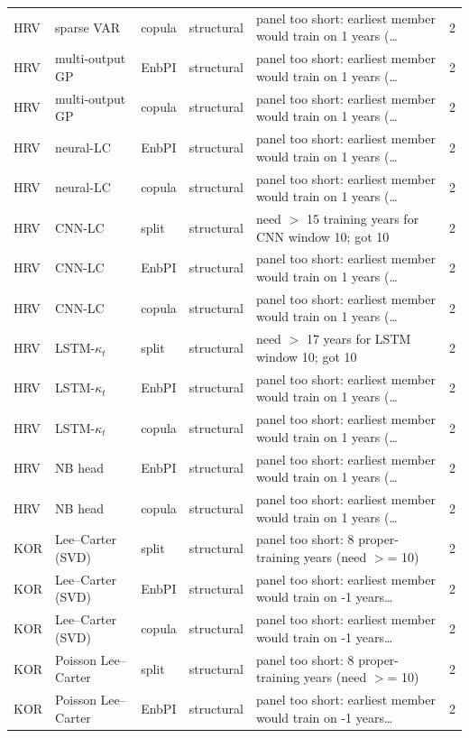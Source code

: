 {\begin{longtable}{@{}lllp{1.6cm}p{6.2cm}r@{}}
HRV & sparse VAR & copula & structural & panel too short: earliest member would train on 1 years (\ldots & 2 \\
HRV & multi-output GP & EnbPI & structural & panel too short: earliest member would train on 1 years (\ldots & 2 \\
HRV & multi-output GP & copula & structural & panel too short: earliest member would train on 1 years (\ldots & 2 \\
HRV & neural-LC & EnbPI & structural & panel too short: earliest member would train on 1 years (\ldots & 2 \\
HRV & neural-LC & copula & structural & panel too short: earliest member would train on 1 years (\ldots & 2 \\
HRV & CNN-LC & split & structural & need $>$ 15 training years for CNN window 10; got 10 & 2 \\
HRV & CNN-LC & EnbPI & structural & panel too short: earliest member would train on 1 years (\ldots & 2 \\
HRV & CNN-LC & copula & structural & panel too short: earliest member would train on 1 years (\ldots & 2 \\
HRV & LSTM-$\kappa_t$ & split & structural & need $>$ 17 years for LSTM window 10; got 10 & 2 \\
HRV & LSTM-$\kappa_t$ & EnbPI & structural & panel too short: earliest member would train on 1 years (\ldots & 2 \\
HRV & LSTM-$\kappa_t$ & copula & structural & panel too short: earliest member would train on 1 years (\ldots & 2 \\
HRV & NB head & EnbPI & structural & panel too short: earliest member would train on 1 years (\ldots & 2 \\
HRV & NB head & copula & structural & panel too short: earliest member would train on 1 years (\ldots & 2 \\
KOR & Lee--Carter (SVD) & split & structural & panel too short: 8 proper-training years (need $>$= 10) & 2 \\
KOR & Lee--Carter (SVD) & EnbPI & structural & panel too short: earliest member would train on -1 years\ldots & 2 \\
KOR & Lee--Carter (SVD) & copula & structural & panel too short: earliest member would train on -1 years\ldots & 2 \\
KOR & Poisson Lee--Carter & split & structural & panel too short: 8 proper-training years (need $>$= 10) & 2 \\
KOR & Poisson Lee--Carter & EnbPI & structural & panel too short: earliest member would train on -1 years\ldots & 2 \\

\end{longtable}}
